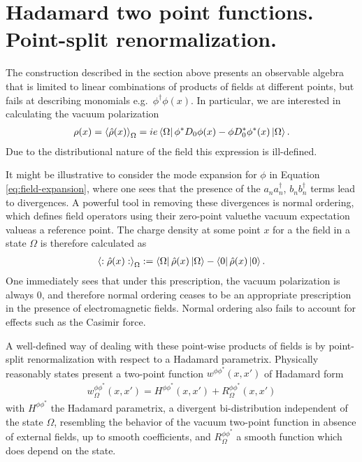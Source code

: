 \section{Hadamard two point functions. Point-split renormalization.}
\label{sec:Hadamard}


The construction described in the section above presents an observable algebra that is limited to linear combinations of products of fields at different points, but fails at describing monomials e.g.~$\phi^\dagger \phi(x)$. In particular, we are interested in calculating the vacuum polarization
\begin{align}
	\rho(x) = \left<\hat{\rho}(x) \right>_\Omega= ie\bra{\Omega} \phi^* D_0\phi(x) - \phi D_0^* \phi^*(x) \ket{\Omega}.
	\label{eq:rho-expectation-value}
\end{align}
Due to the distributional nature of the field this expression is ill-defined.

It might be illustrative to consider the mode expansion for $\phi$ in Equation \eqref{eq:field-expansion}, where one sees that the presence of  the $a_n a^\dagger_n$, $b_n b_n^\dagger$ terms lead to divergences.  A powerful tool in removing these divergences is normal ordering, which defines field operators using their zero-point value\textemdash the vacuum expectation value\textemdash as a reference point. The charge density at some point $x$ for a the field in a state $\Omega$ is therefore calculated as
\begin{align}
	\left<:\hat{\rho}(x) :\right>_\Omega:= \bra{\Omega} \hat{\rho}(x) \ket{\Omega} - \bra{0} \hat{\rho}(x) \ket{0}.
\end{align}
One immediately sees that under this prescription, the vacuum polarization is always 0, and therefore normal ordering ceases to be an appropriate prescription in the presence of electromagnetic fields.  Normal ordering also fails to account for effects such as the Casimir force. 


A well-defined way of dealing with these point-wise products of fields is by point-split renormalization with respect to a Hadamard parametrix. Physically reasonably states  present a two-point function $w^{\phi \phi^*}(x, x')$ of Hadamard form \cite{Wroc2011}
\begin{align}
    w_\Omega^{\phi \phi^*}(x, x') = 
    H^{\phi \phi^*}(x, x') + R_\Omega^{\phi \phi^*}(x, x')
\end{align}
with $H^{\phi \phi^*}$ the Hadamard parametrix, a divergent bi-distribution independent of the state $\Omega$, resembling the behavior of the vacuum two-point function in absence of external fields, up to smooth coefficients, and $R_\Omega^{\phi\phi^*}$ a smooth function which does depend on the state.

